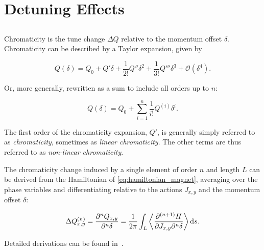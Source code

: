 \section{Detuning Effects}




\subsection{}

Chromaticity is the tune change $\Delta Q$ relative to the momentum offset $\delta$. Chromaticity
can be described by a Taylor expansion, given by

\begin{equation} 
    Q (\delta) = Q_0 + Q' \delta + \frac{1}{2!} Q'' \delta^2 + \frac{1}{3!} Q''' \delta^3 + \mathcal{O}(\delta^4).
    \label{eq:background_chromaticity}
\end{equation}

Or, more generally, rewritten as a sum to include all orders up to $n$:

\begin{equation}
    Q (\delta) = Q_0 + \sum_{i=1}^n \frac{1}{i!} Q^{(i)} \delta^i.
    \label{eq:background_chromaticity_sum}
\end{equation}


The first order of the chromaticity expansion, $Q'$, is generally simply referred to as 
\textit{chromaticity}, sometimes as \textit{linear chromaticity}.
The other terms are thus referred to as \textit{non-linear chromaticity}.

The chromaticity change induced by a single element of order $n$ and length $L$ can be derived from
the Hamiltonian of \cref{eq:hamiltonian_magnet}, averaging over the phase variables and
differentiating relative to the actions $J_{x,y}$ and the momentum offset $\delta$:

\begin{equation}
    \Delta Q^{(n)}_{x,y} = \frac{\partial^n Q_{x,y}}{\partial^n \delta} = 
      \frac{1}{2\pi} \int_L \left< \frac{\partial^{(n+1)} H}{\partial J_{x,y}\partial^n \delta}\right> \mathop{}\!\mathrm{d} s.
    \label{eq:background_chroma_order_hamiltonian}
\end{equation}

Detailed derivations can be found in~\cite{dilly_derivation_2023}.

